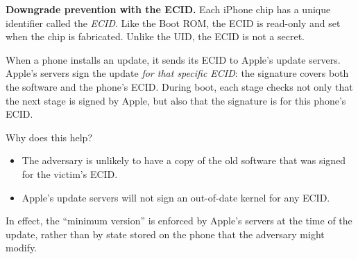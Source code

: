 \documentclass[
  letterpaper,
]{scrbook}
\theoremstyle{definition}
\theoremstyle{plain}
\theoremstyle{plain}
\theoremstyle{remark}
\begin{document}
\textbf{Downgrade prevention with the ECID.} Each iPhone chip has a
unique identifier called the \emph{ECID}. Like the Boot ROM, the ECID is
read-only and set when the chip is fabricated. Unlike the UID, the ECID
is not a secret.

When a phone installs an update, it sends its ECID to Apple's update
servers. Apple's servers sign the update \emph{for that specific ECID}:
the signature covers both the software and the phone's ECID. During
boot, each stage checks not only that the next stage is signed by Apple,
but also that the signature is for this phone's ECID.


Why does this help?

\begin{itemize}
\item
  The adversary is unlikely to have a copy of the old software that was
  signed for the victim's ECID.

\item
  Apple's update servers will not sign an out-of-date kernel for any
  ECID.
\end{itemize}

In effect, the ``minimum version'' is enforced by Apple's servers at the
time of the update, rather than by state stored on the phone that the
adversary might modify.
\end{document}
